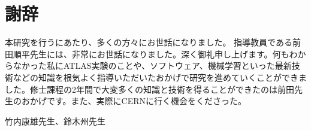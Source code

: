 \chapter*{謝辞}

本研究を行うにあたり、多くの方々にお世話になりました。
指導教員である前田順平先生には、非常にお世話になりました。深く御礼申し上げます。何もわからなかった私にATLAS実験のことや、ソフトウェア、機械学習といった最新技術などの知識を根気よく指導いただいたおかげで研究を進めていくことができました。修士課程の2年間で大変多くの知識と技術を得ることができたのは前田先生のおかげです。また、実際にCERNに行く機会をくださった。


竹内康雄先生、鈴木州先生
